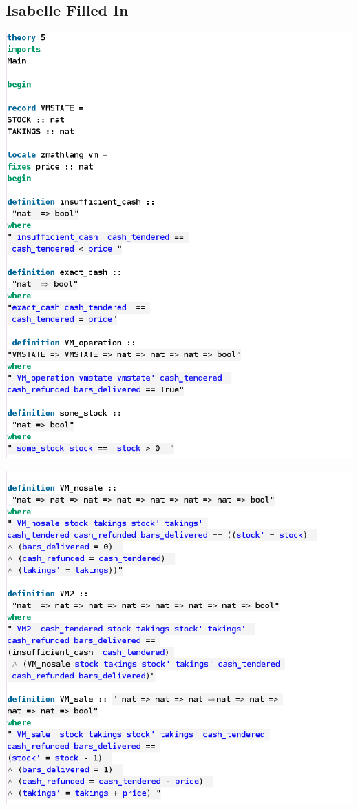 
\subsection{Isabelle Filled In}
\label{app:vm5}
\includegraphics[scale=0.5]{examples/vm/5imagea.png}

\noindent \includegraphics[scale=0.5]{examples/vm/5imageb.png}

